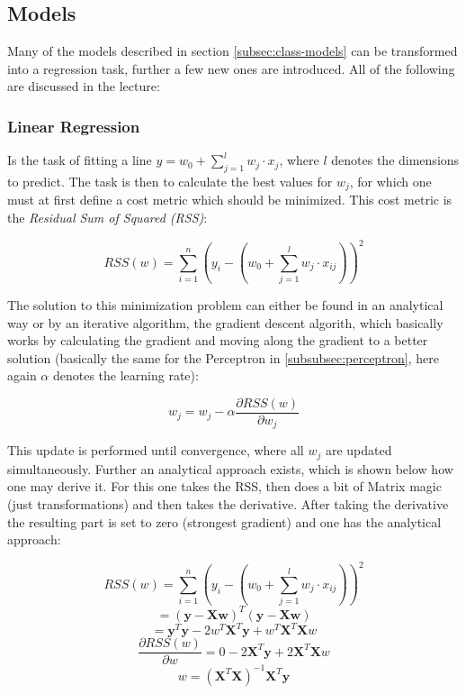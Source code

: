 \documentclass[12pt,a4paper]{article}
\begin{document}
\subsection{Models}

\noindent Many of the models described in section \ref{subsec:class-models} can be transformed into a regression task, further a few new ones are introduced. All of the following are discussed in the lecture:

\subsubsection{Linear Regression}

\noindent Is the task of fitting a line \(y = w_0 + \sum_{j = 1}^l w_j \cdot x_j\), where \(l\) denotes the dimensions to predict. The task is then to calculate the best values for \(w_j\), for which one must at first define a cost metric which should be minimized. This cost metric is the \textit{Residual Sum of Squared (RSS)}:

\[RSS(w) = \sum_{i = 1}^n (y_i - (w_0 + \sum_{j = 1}^l w_j \cdot x_{ij}))^2\]

\noindent The solution to this minimization problem can either be found in an analytical way or by an iterative algorithm, the gradient descent algorith, which basically works by calculating the gradient and moving along the gradient to a better solution (basically the same for the Perceptron in \ref{subsubsec:perceptron}, here again \(\alpha\) denotes the learning rate):

\[w_j = w_j - \alpha \frac{\partial RSS(w)}{\partial w_j} \]

\noindent This update is performed until convergence, where all \(w_j\) are updated simultaneously. Further an analytical approach exists, which is shown below how one may derive it. For this one takes the RSS, then does a bit of Matrix magic (just transformations) and then takes the derivative. After taking the derivative the resulting part is set to zero (strongest gradient) and one has the analytical approach: 

\[RSS(w) = \sum_{i = 1}^n (y_i - (w_0 + \sum_{j = 1}^l w_j \cdot x_{ij}))^2\]
\[= (\mathbf{y} - \mathbf{Xw})^T (\mathbf{y} - \mathbf{Xw})\]
\[= \mathbf{y}^T \mathbf{y} - 2 w^T \mathbf{X}^T \mathbf{y} + w^T \mathbf{X}^T \mathbf{X} w\]
\[\frac{\partial RSS(w)}{\partial w} = 0 - 2 \mathbf{X}^T \mathbf{y} + 2 \mathbf{X}^T \mathbf{X} w\]
\[w = (\mathbf{X}^T \mathbf{X})^{-1} \mathbf{X}^T \mathbf{y} \]
\end{document}
